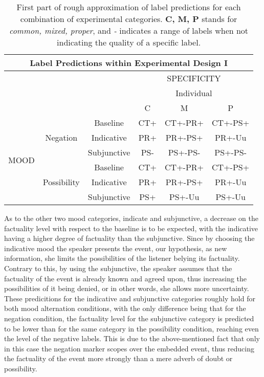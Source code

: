\begin{table}
\centering
\begin{tabular}{|c|c|c|c|c|c|}
\hline
\multicolumn{6}{|c|}{Label Predictions within Experimental Design I}\\\hline
                      & & &\multicolumn{3}{c|}{SPECIFICITY} \\\cline{4-6} 
                      & & & \multicolumn{3}{c|}{Individual}\\\cline{4-6} 
                      & & & C & M & P\\\hline 
\multirow{6}{*}{MOOD} & \multirow{3}{*}{Negation} & Baseline & CT+ & CT+-PR+ & CT+-PS+\\\cline{3-6}
                      &                           & Indicative & PR+ & PR+-PS+ & PR+-Uu \\\cline{3-6}
                      &                           & Subjunctive & PS- & PS+-PS- & PS+-PS-\\ \cline{2-6}\cline{2-6}                     
                      &\multirow{3}{*}{Possibility}& Baseline & CT+ & CT+-PR+ & CT+-PS+\\\cline{3-6}
                      &                           & Indicative & PR+ & PR+-PS+ & PR+-Uu\\\cline{3-6}
                      &                           & Subjunctive & PS+ & PS+-Uu & PS+-Uu\\\hline                                                          
\end{tabular}
\caption[Label predictions I.]{First part of rough approximation of label predictions for each combination of experimental categories. \textbf{C, M, P} stands for \textit{common, mixed, proper}, and \textit{-} indicates a range of labels when not indicating the quality of a specific label.}
\label{tab:pilpredict1}
\end{table}

As to the other two mood categories, indicate and subjunctive, a decrease on the factuality level with respect to the baseline is to be expected, with the indicative having a higher degree of factuality than the subjunctive. Since by choosing the indicative mood the speaker presents the event, our hypothesis, as new information, she limits the possibilities of the listener belying its factuality. Contrary to this, by using the subjunctive, the speaker assumes that the factuality of the event is already known and agreed upon, thus increasing the possibilities of it being denied, or in other words, she allows more uncertainty. These predicitions for the indicative and subjunctive categories roughly hold for both mood alternation conditions, with the only difference being that for the negation condition, the factuality level for the subjunctive category is predicted to be lower than for the same category in the possibility condition, reaching even the level of the negative labels. This is due to the above-mentioned fact that only in this case the negation marker scopes over the embedded event, thus reducing the factuality of the event more strongly than a mere adverb of doubt or possibility.\\


